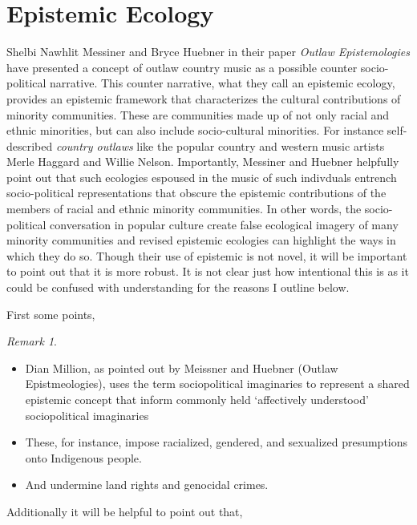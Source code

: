 \documentclass[phdthesis,12pt,final]{wuthesis}
\theoremstyle{definition}
\theoremstyle{definition}
\theoremstyle{definition}
\theoremstyle{definition}
\theoremstyle{remark}
\newtheorem*{remark}{Remark}
\begin{document}
\section{Epistemic Ecology}\label{epistemic-ecology}

Shelbi Nawhlit Messiner and Bryce Huebner in their paper \emph{Outlaw Epistemologies} have presented a concept of outlaw country music as a possible counter socio-political narrative. This counter narrative, what they call an epistemic ecology, provides an epistemic framework that characterizes the cultural contributions of minority communities. These are communities made up of not only racial and ethnic minorities, but can also include socio-cultural minorities. For instance self-described \emph{country outlaws} like the popular country and western music artists Merle Haggard and Willie Nelson. Importantly, Messiner and Huebner helpfully point out that such ecologies espoused in the music of such indivduals entrench socio-political representations that obscure the epistemic contributions of the members of racial and ethnic minority communities. In other words, the socio-political conversation in popular culture create false ecological imagery of many minority communities and revised epistemic ecologies can highlight the ways in which they do so. Though their use of epistemic is not novel, it will be important to point out that it is more robust. It is not clear just how intentional this is as it could be confused with understanding for the reasons I outline below.

First some points,

\begin{remark}
\leavevmode

\begin{itemize}
\tightlist
\item
  Dian Million, as pointed out by Meissner and Huebner (Outlaw Epistmeologies), uses the term sociopolitical imaginaries to represent a shared epistemic concept that inform commonly held `affectively understood' sociopolitical imaginaries
\item
  These, for instance, impose racialized, gendered, and sexualized presumptions onto Indigenous people.
\item
  And undermine land rights and genocidal crimes.
\end{itemize}

\end{remark}

Additionally it will be helpful to point out that,
\end{document}
